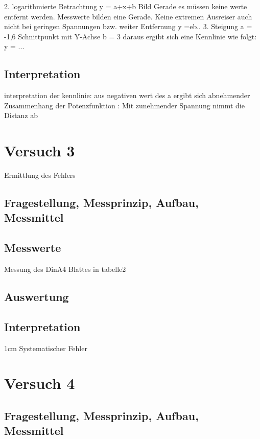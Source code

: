 \documentclass[12pt,oneside,a4paper]{report}
\begin{document}
2. logarithmierte Betrachtung y = a+x+b Bild Gerade
	es müssen keine werte entfernt werden. Messwerte bilden eine Gerade. Keine  	    extremen Ausreiser auch nicht bei geringen Spannungen bzw. weiter Entfernung
	y =eb..
3. Steigung a = -1,6 Schnittpunkt mit Y-Achse b = 3
  daraus ergibt sich eine Kennlinie wie folgt: y = ...

\section{Interpretation}
\label{chap:VERSUCH_2_INTERPRETATION}
interpretation der kennlinie: 
aus negativen wert des a ergibt sich abnehmender Zusammenhang der Potenzfunktion : Mit zunehmender Spannung nimmt die Distanz ab




%
%
\chapter{Versuch 3}
\label{chap:VERSUCH_3}
Ermittlung des Fehlers
\section{Fragestellung, Messprinzip, Aufbau, Messmittel}
\label{chap:VERSUCH_3_FRAGESTELLUNG}

\section{Messwerte}
\label{chap:VERSUCH_3_MESSWERTE}
Messung des DinA4 Blattes in tabelle2

\section{Auswertung}
\label{chap:VERSUCH_3_AUSWERTUNG}

\section{Interpretation}
\label{chap:VERSUCH_3_INTERPRETATION}
1cm Systematischer Fehler


%
%
\chapter{Versuch 4}
\label{chap:VERSUCH_4}

\section{Fragestellung, Messprinzip, Aufbau, Messmittel}
\label{chap:VERSUCH_4_FRAGESTELLUNG}
\end{document}
